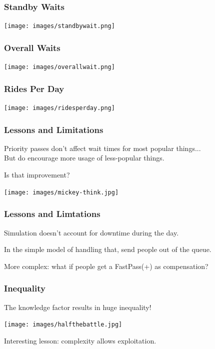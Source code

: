 \begin{frame}
\frametitle{Standby Waits}

\begin{center}
	\texttt{[image: images/standbywait.png]}
\end{center}

\end{frame}


\begin{frame}
\frametitle{Overall Waits}

\begin{center}
	\texttt{[image: images/overallwait.png]}
\end{center}

\end{frame}


\begin{frame}
\frametitle{Rides Per Day}

\begin{center}
	\texttt{[image: images/ridesperday.png]}
\end{center}

\end{frame}


\begin{frame}
\frametitle{Lessons and Limitations}

Priority passes don't affect wait times for most popular things...\\
\quad But do encourage more usage of less-popular things.

Is that improvement?

\begin{center}
	\texttt{[image: images/mickey-think.jpg]}
\end{center}


\end{frame}


\begin{frame}
\frametitle{Lessons and Limtations}
Simulation doesn't account for downtime during the day.

In the simple model of handling that, send people out of the queue.

More complex: what if people get a FastPass(+) as compensation?


\end{frame}


\begin{frame}
\frametitle{Inequality}

The knowledge factor results in huge inequality!

\begin{center}
	\texttt{[image: images/halfthebattle.jpg]}
\end{center}

Interesting lesson: complexity allows exploitation.

\end{frame}







